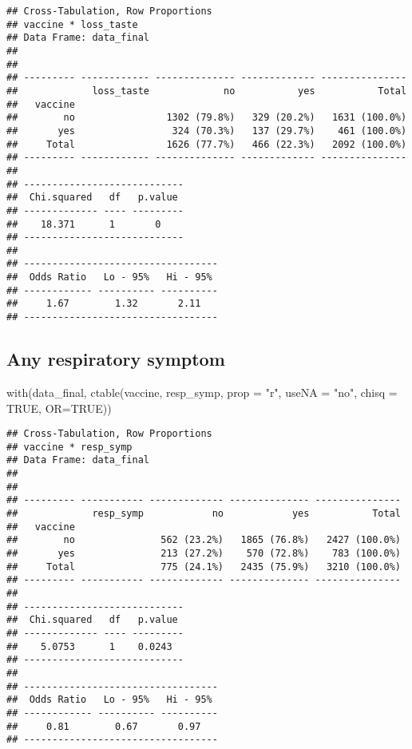 \documentclass[
]{article}
\newenvironment{Shaded}{\begin{snugshade}}{\end{snugshade}}
\newcommand{\AttributeTok}[1]{\textcolor[rgb]{0.77,0.63,0.00}{#1}}
\newcommand{\ConstantTok}[1]{\textcolor[rgb]{0.00,0.00,0.00}{#1}}
\newcommand{\FunctionTok}[1]{\textcolor[rgb]{0.00,0.00,0.00}{#1}}
\newcommand{\NormalTok}[1]{#1}
\newcommand{\StringTok}[1]{\textcolor[rgb]{0.31,0.60,0.02}{#1}}
\begin{document}
\begin{verbatim}
## Cross-Tabulation, Row Proportions  
## vaccine * loss_taste  
## Data Frame: data_final  
## 
## 
## --------- ------------ -------------- ------------- ---------------
##             loss_taste             no           yes           Total
##   vaccine                                                          
##        no                1302 (79.8%)   329 (20.2%)   1631 (100.0%)
##       yes                 324 (70.3%)   137 (29.7%)    461 (100.0%)
##     Total                1626 (77.7%)   466 (22.3%)   2092 (100.0%)
## --------- ------------ -------------- ------------- ---------------
## 
## ----------------------------
##  Chi.squared   df   p.value 
## ------------- ---- ---------
##    18.371      1       0    
## ----------------------------
## 
## ----------------------------------
##  Odds Ratio   Lo - 95%   Hi - 95% 
## ------------ ---------- ----------
##     1.67        1.32       2.11   
## ----------------------------------
\end{verbatim}

\hypertarget{any-respiratory-symptom}{%
\subsection{Any respiratory symptom}\label{any-respiratory-symptom}}

\begin{Shaded}
\begin{Highlighting}[]
\FunctionTok{with}\NormalTok{(data\_final, }\FunctionTok{ctable}\NormalTok{(vaccine, resp\_symp, }\AttributeTok{prop =} \StringTok{"r"}\NormalTok{, }\AttributeTok{useNA =} \StringTok{"no"}\NormalTok{, }\AttributeTok{chisq =} \ConstantTok{TRUE}\NormalTok{, }\AttributeTok{OR=}\ConstantTok{TRUE}\NormalTok{))}
\end{Highlighting}
\end{Shaded}

\begin{verbatim}
## Cross-Tabulation, Row Proportions  
## vaccine * resp_symp  
## Data Frame: data_final  
## 
## 
## --------- ----------- ------------- -------------- ---------------
##             resp_symp            no            yes           Total
##   vaccine                                                         
##        no               562 (23.2%)   1865 (76.8%)   2427 (100.0%)
##       yes               213 (27.2%)    570 (72.8%)    783 (100.0%)
##     Total               775 (24.1%)   2435 (75.9%)   3210 (100.0%)
## --------- ----------- ------------- -------------- ---------------
## 
## ----------------------------
##  Chi.squared   df   p.value 
## ------------- ---- ---------
##    5.0753      1    0.0243  
## ----------------------------
## 
## ----------------------------------
##  Odds Ratio   Lo - 95%   Hi - 95% 
## ------------ ---------- ----------
##     0.81        0.67       0.97   
## ----------------------------------
\end{verbatim}
\end{document}
